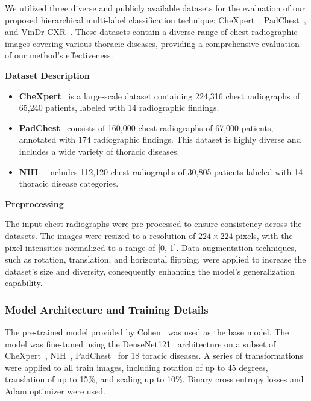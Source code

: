 \documentclass[preprint,3p,times, review]{elsarticle}
\begin{document}
We utilized three diverse and publicly available datasets for the evaluation of our proposed hierarchical multi-label classification technique: CheXpert~\cite{1902693:27875857}, PadChest~\cite{1902693:27875858}, and VinDr-CXR~\cite{1902693:27875859}. These datasets contain a diverse range of chest radiographic images covering various thoracic diseases, providing a comprehensive evaluation of our method's effectiveness.

\textbf{Dataset Description}

\begin{itemize}
    \item  \textbf{CheXpert}~\cite{irvin_CheXpert_2019} is a large-scale dataset containing 224,316 chest radiographs of 65,240 patients, labeled with 14 radiographic findings.

    \item \textbf{PadChest}~\cite{bustos_Padchest_2020} consists of 160,000 chest radiographs of 67,000 patients, annotated with 174 radiographic findings. This dataset is highly diverse and includes a wide variety of thoracic diseases.

    \item \textbf{NIH }~\cite{wang_ChestXRay8_2017} includes 112,120 chest radiographs of 30,805 patients labeled with 14 thoracic disease categories.
\end{itemize}

\textbf{Preprocessing}

The input chest radiographs were pre-processed to ensure consistency across the datasets. The images were resized to a resolution of $224 \times 224$ pixels, with the pixel intensities normalized to a range of [0, 1]. Data augmentation techniques, such as rotation, translation, and horizontal flipping, were applied to increase the dataset's size and diversity, consequently enhancing the model's generalization capability.



\subsubsection{Model Architecture and Training Details}

The pre-trained model provided by Cohen~\cite{cohen_TorchXRayVision_2022} was used as the base model. The model was fine-tuned using the DenseNet121~\cite{1902693:27875848} architecture on a subset of CheXpert~\cite{1902693:27875857}, NIH~\cite{1902693:27875825}, PadChest~\cite{1902693:27875858} for 18 toracic diseases. A series of transformations were applied to all train images, including rotation of up to 45 degrees, translation of up to 15\%, and scaling up to 10\%. Binary cross entropy losses and Adam optimizer were used.
\end{document}
